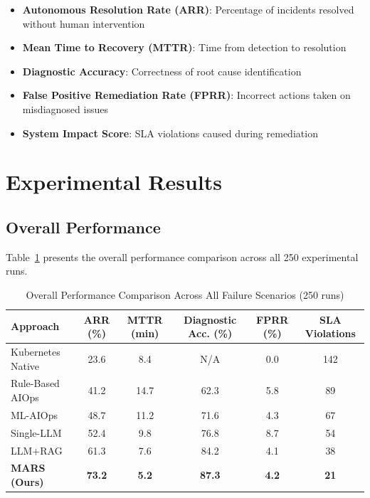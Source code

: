 \documentclass[journal]{IEEEtran}
\begin{document}
\begin{itemize}
    \item \textbf{Autonomous Resolution Rate (ARR)}: Percentage of incidents resolved without human intervention
    \item \textbf{Mean Time to Recovery (MTTR)}: Time from detection to resolution
    \item \textbf{Diagnostic Accuracy}: Correctness of root cause identification
    \item \textbf{False Positive Remediation Rate (FPRR)}: Incorrect actions taken on misdiagnosed issues
    \item \textbf{System Impact Score}: SLA violations caused during remediation
\end{itemize}

\section{Experimental Results}
\label{sec:results}

\subsection{Overall Performance}

Table~\ref{tab:overall_results} presents the overall performance comparison across all 250 experimental runs.

\begin{table}[t]
\centering
\caption{Overall Performance Comparison Across All Failure Scenarios (250 runs)}
\label{tab:overall_results}
\begin{tabular}{@{}lccccc@{}}
\toprule
\textbf{Approach} & \textbf{ARR (\%)} & \textbf{MTTR (min)} & \textbf{Diagnostic Acc. (\%)} & \textbf{FPRR (\%)} & \textbf{SLA Violations} \\
\midrule
Kubernetes Native & 23.6 & 8.4 & N/A & 0.0 & 142 \\
Rule-Based AIOps & 41.2 & 14.7 & 62.3 & 5.8 & 89 \\
ML-AIOps & 48.7 & 11.2 & 71.6 & 4.3 & 67 \\
Single-LLM & 52.4 & 9.8 & 76.8 & 8.7 & 54 \\
LLM+RAG & 61.3 & 7.6 & 84.2 & 4.1 & 38 \\
\textbf{MARS (Ours)} & \textbf{73.2} & \textbf{5.2} & \textbf{87.3} & \textbf{4.2} & \textbf{21} \\
\bottomrule
\end{tabular}
\end{table}
\end{document}
